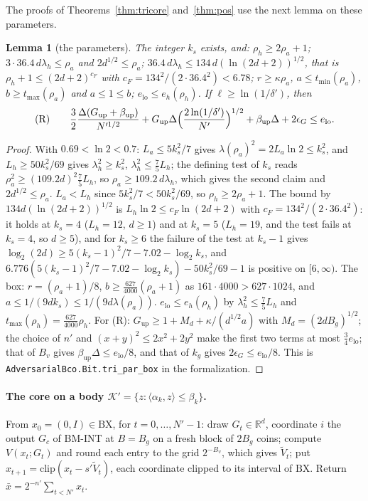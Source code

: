 \documentclass[11pt]{amsart}
\newtheorem{lemma}[theorem]{Lemma}
\theoremstyle{definition}
\numberwithin{equation}{section}
\newcommand{\R}{\mathbb{R}}
\newcommand{\cK}{\mathcal{K}}
\newcommand{\ip}[1]{\langle #1\rangle}
\begin{document}
The proofs of Theorems~\ref{thm:tricore} and~\ref{thm:pos} use the next lemma on these parameters.

\begin{lemma}[the parameters]\label{lem:par}
The integer $k_s$ exists, and: $\rho_h\ge2\rho_a+1$; $3\cdot36.4\,d\lambda_h\le\rho_a$ and $2d^{1/2}\le\rho_a$; $36.4\,d\lambda_h\le134\,d(\ln(2d+2))^{1/2}$, that is $\rho_h+1\le(2d+2)^{c_F}$ with $c_F=134^2/(2\cdot36.4^2)<6.78$; $r\ge\kappa\rho_a$, $a\le t_{\min}(\rho_a)$, $b\ge t_{\max}(\rho_a)$ and $a\le1\le b$; $e_{\mathrm{lo}}\le e_h(\rho_h)$. If $\ell\ge\ln(1/\delta')$, then
\[
\mathrm{(R)}\qquad\frac32\frac{\Delta(G_{\mathrm{up}}+\beta_{\mathrm{up}})}{N'^{1/2}}+G_{\mathrm{up}}\Delta\Bigl(\frac{2\ln(1/\delta')}{N'}\Bigr)^{1/2}+\beta_{\mathrm{up}}\Delta+2\epsilon_G\le e_{\mathrm{lo}} .
\]
\end{lemma}

\begin{proof}
With $0.69<\ln2<0.7$: $L_a\le5k_s^2/7$ gives $\lambda(\rho_a)^2=2L_a\ln2\le k_s^2$, and $L_h\ge50k_s^2/69$ gives $\lambda_h^2\ge k_s^2$, $\lambda_h^2\le\frac75L_h$; the defining test of $k_s$ reads $\rho_a^2\ge(109.2d)^2\frac75L_h$, so $\rho_a\ge109.2\,d\lambda_h$, which gives the second claim and $2d^{1/2}\le\rho_a$. $L_a<L_h$ since $5k_s^2/7<50k_s^2/69$, so $\rho_h\ge2\rho_a+1$. The bound by $134d(\ln(2d+2))^{1/2}$ is $L_h\ln2\le c_F\ln(2d+2)$ with $c_F=134^2/(2\cdot36.4^2)$: it holds at $k_s=4$ ($L_h=12$, $d\ge1$) and at $k_s=5$ ($L_h=19$, and the test fails at $k_s=4$, so $d\ge5$), and for $k_s\ge6$ the failure of the test at $k_s-1$ gives $\log_2(2d)\ge5(k_s-1)^2/7-7.02-\log_2k_s$, and $6.776(5(k_s-1)^2/7-7.02-\log_2k_s)-50k_s^2/69-1$ is positive on $[6,\infty)$. The box: $r=(\rho_a+1)/8$, $b\ge\frac{627}{4000}(\rho_a+1)$ as $161\cdot4000>627\cdot1024$, and $a\le1/(9dk_s)\le1/(9d\lambda(\rho_a))$. $e_{\mathrm{lo}}\le e_h(\rho_h)$ by $\lambda_h^2\le\frac75L_h$ and $t_{\max}(\rho_h)=\frac{627}{4000}\rho_h$. For (R): $G_{\mathrm{up}}\ge1+M_d+\kappa/(d^{1/2}a)$ with $M_d=(2dB_g)^{1/2}$; the choice of $n'$ and $(x+y)^2\le2x^2+2y^2$ make the first two terms at most $\frac34e_{\mathrm{lo}}$; that of $B_v$ gives $\beta_{\mathrm{up}}\Delta\le e_{\mathrm{lo}}/8$, and that of $k_g$ gives $2\epsilon_G\le e_{\mathrm{lo}}/8$.
This is \texttt{AdversarialBco.Bit.tri\_par\_box} in the formalization.
\end{proof}

\paragraph{The core on a body $\cK'=\{z:\ip{\alpha_k,z}\le\beta_k\}$.} From $x_0=(0,I)\in\mathrm{BX}$, for $t=0,\dots,N'-1$: draw $G_t\in\R^d$, coordinate $i$ the output $G_c$ of BM-INT at $B=B_g$ on a fresh block of $2B_g$ coins; compute $V(x_t;G_t)$ and round each entry to the grid $2^{-B_v}$, which gives $\tilde V_t$; put $x_{t+1}=\mathrm{clip}(x_t-s'\tilde V_t)$, each coordinate clipped to its interval of $\mathrm{BX}$. Return $\bar x=2^{-n'}\sum_{t<N'}x_t$.
\end{document}
